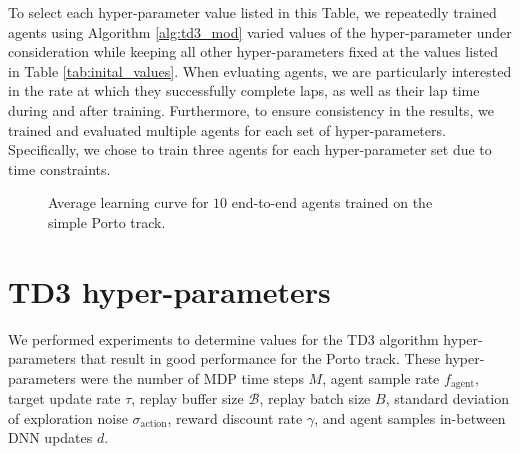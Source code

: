 

To select each hyper-parameter value listed in this Table, we repeatedly trained agents using Algorithm \ref{alg:td3_mod} 
varied values of the hyper-parameter under consideration while keeping all other hyper-parameters fixed at the values listed in Table \ref{tab:inital_values}. 
When evluating agents, we are particularly interested in the rate at which they successfully complete laps, as well as their lap time during and after training.
Furthermore, to ensure consistency in the results, we trained and evaluated multiple agents for each set of hyper-parameters. 
Specifically, we chose to train three agents for each hyper-parameter set due to time constraints.



%     

\begin{figure}[htb!]
    \centering
    
    \caption[Learning curve for end-to-end agents]{Average learning curve for $10$ end-to-end agents trained on the simple Porto track.}
    \label{fig:MDP_steps_learning_curve}
\end{figure}



\section{TD3 hyper-parameters}\label{sec:algorithm_selection}


We performed experiments to determine values for the TD3 algorithm hyper-parameters that result in good performance for the Porto track.
These hyper-parameters were the number of MDP time steps $M$, agent sample rate $f_{\text{agent}}$, target update rate $\tau$, replay buffer size $\mathcal{B}$, replay batch size $B$, standard deviation of exploration noise $\sigma_{\text{action}}$, reward discount rate $\gamma$, and agent samples in-between DNN updates $d$.


